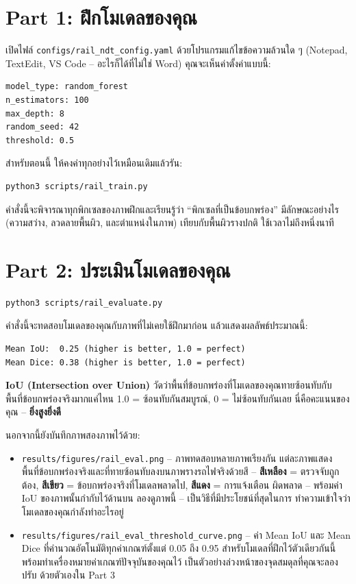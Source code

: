 \documentclass[11pt]{article}
\begin{document}
\section*{Part 1: ฝึกโมเดลของคุณ}
เปิดไฟล์ \texttt{configs/rail\_ndt\_config.yaml} ด้วยโปรแกรมแก้ไขข้อความล้วนใด ๆ (Notepad,
TextEdit, VS Code -- อะไรก็ได้ที่ไม่ใช่ Word) คุณจะเห็นค่าตั้งค่าแบบนี้:

\begin{lstlisting}
model_type: random_forest
n_estimators: 100
max_depth: 8
random_seed: 42
threshold: 0.5
\end{lstlisting}

สำหรับตอนนี้ ให้คงค่าทุกอย่างไว้เหมือนเดิมแล้วรัน:

\begin{lstlisting}
python3 scripts/rail_train.py
\end{lstlisting}

คำสั่งนี้จะพิจารณาทุกพิกเซลของภาพฝึกและเรียนรู้ว่า ``พิกเซลที่เป็นข้อบกพร่อง'' มีลักษณะอย่างไร
(ความสว่าง, ลวดลายพื้นผิว, และตำแหน่งในภาพ) เทียบกับพื้นผิวรางปกติ ใช้เวลาไม่ถึงหนึ่งนาที

\section*{Part 2: ประเมินโมเดลของคุณ}
\begin{lstlisting}
python3 scripts/rail_evaluate.py
\end{lstlisting}

คำสั่งนี้จะทดสอบโมเดลของคุณกับภาพที่ไม่เคยใช้ฝึกมาก่อน แล้วแสดงผลลัพธ์ประมาณนี้:

\begin{lstlisting}
Mean IoU:  0.25 (higher is better, 1.0 = perfect)
Mean Dice: 0.38 (higher is better, 1.0 = perfect)
\end{lstlisting}

\textbf{IoU (Intersection over Union)} วัดว่าพื้นที่ข้อบกพร่องที่โมเดลของคุณทายซ้อนทับกับ
พื้นที่ข้อบกพร่องจริงมากแค่ไหน 1.0 = ซ้อนทับกันสมบูรณ์, 0 = ไม่ซ้อนทับกันเลย นี่คือคะแนนของคุณ
-- \textbf{ยิ่งสูงยิ่งดี}

นอกจากนี้ยังบันทึกภาพสองภาพไว้ด้วย:
\begin{itemize}
  \item \texttt{results/figures/rail\_eval.png} -- ภาพทดสอบหลายภาพเรียงกัน แต่ละภาพแสดง
  พื้นที่ข้อบกพร่องจริงและที่ทายซ้อนทับลงบนภาพรางรถไฟจริงด้วยสี -- \textbf{สีเหลือง} =
  ตรวจจับถูกต้อง, \textbf{สีเขียว} = ข้อบกพร่องจริงที่โมเดลพลาดไป, \textbf{สีแดง} = การแจ้งเตือน
  ผิดพลาด -- พร้อมค่า IoU ของภาพนั้นกำกับไว้ด้านบน ลองดูภาพนี้ -- เป็นวิธีที่มีประโยชน์ที่สุดในการ
  ทำความเข้าใจว่าโมเดลของคุณกำลังทำอะไรอยู่
  \item \texttt{results/figures/rail\_eval\_threshold\_curve.png} -- ค่า Mean IoU และ Mean
  Dice ที่คำนวณอัตโนมัติทุกค่าเกณฑ์ตั้งแต่ 0.05 ถึง 0.95 สำหรับโมเดลที่ฝึกไว้ตัวเดียวกันนี้
  พร้อมทำเครื่องหมายค่าเกณฑ์ปัจจุบันของคุณไว้ เป็นตัวอย่างล่วงหน้าของจุดสมดุลที่คุณจะลองปรับ
  ด้วยตัวเองใน Part 3
\end{itemize}
\end{document}
